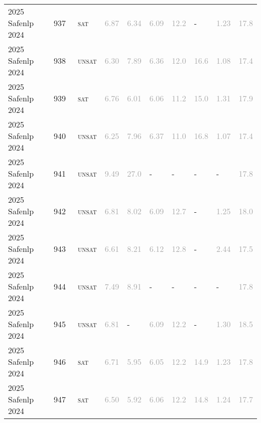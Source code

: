 \begin{center}
{\begin{longtable}{@{}llllllllll@{}}
2025 Safenlp 2024 & 937 & ~\textsc{sat} & \textcolor{darkgray}{6.87} & \textcolor{darkgray}{6.34} & \textcolor{darkgray}{6.09} & \textcolor{darkgray}{12.2} & - & \textcolor{darkgray}{1.23} & \textcolor{darkgray}{17.8} \\
2025 Safenlp 2024 & 938 & ~\textsc{unsat} & \textcolor{darkgray}{6.30} & \textcolor{darkgray}{7.89} & \textcolor{darkgray}{6.36} & \textcolor{darkgray}{12.0} & \textcolor{darkgray}{16.6} & \textcolor{darkgray}{1.08} & \textcolor{darkgray}{17.4} \\
2025 Safenlp 2024 & 939 & ~\textsc{sat} & \textcolor{darkgray}{6.76} & \textcolor{darkgray}{6.01} & \textcolor{darkgray}{6.06} & \textcolor{darkgray}{11.2} & \textcolor{darkgray}{15.0} & \textcolor{darkgray}{1.31} & \textcolor{darkgray}{17.9} \\
2025 Safenlp 2024 & 940 & ~\textsc{unsat} & \textcolor{darkgray}{6.25} & \textcolor{darkgray}{7.96} & \textcolor{darkgray}{6.37} & \textcolor{darkgray}{11.0} & \textcolor{darkgray}{16.8} & \textcolor{darkgray}{1.07} & \textcolor{darkgray}{17.4} \\
2025 Safenlp 2024 & 941 & ~\textsc{unsat} & \textcolor{darkgray}{9.49} & \textcolor{darkgray}{27.0} & - & - & - & - & \textcolor{darkgray}{17.8} \\
2025 Safenlp 2024 & 942 & ~\textsc{unsat} & \textcolor{darkgray}{6.81} & \textcolor{darkgray}{8.02} & \textcolor{darkgray}{6.09} & \textcolor{darkgray}{12.7} & - & \textcolor{darkgray}{1.25} & \textcolor{darkgray}{18.0} \\
2025 Safenlp 2024 & 943 & ~\textsc{unsat} & \textcolor{darkgray}{6.61} & \textcolor{darkgray}{8.21} & \textcolor{darkgray}{6.12} & \textcolor{darkgray}{12.8} & - & \textcolor{darkgray}{2.44} & \textcolor{darkgray}{17.5} \\
2025 Safenlp 2024 & 944 & ~\textsc{unsat} & \textcolor{darkgray}{7.49} & \textcolor{darkgray}{8.91} & - & - & - & - & \textcolor{darkgray}{17.8} \\
2025 Safenlp 2024 & 945 & ~\textsc{unsat} & \textcolor{darkgray}{6.81} & - & \textcolor{darkgray}{6.09} & \textcolor{darkgray}{12.2} & - & \textcolor{darkgray}{1.30} & \textcolor{darkgray}{18.5} \\
2025 Safenlp 2024 & 946 & ~\textsc{sat} & \textcolor{darkgray}{6.71} & \textcolor{darkgray}{5.95} & \textcolor{darkgray}{6.05} & \textcolor{darkgray}{12.2} & \textcolor{darkgray}{14.9} & \textcolor{darkgray}{1.23} & \textcolor{darkgray}{17.8} \\
2025 Safenlp 2024 & 947 & ~\textsc{sat} & \textcolor{darkgray}{6.50} & \textcolor{darkgray}{5.92} & \textcolor{darkgray}{6.06} & \textcolor{darkgray}{12.2} & \textcolor{darkgray}{14.8} & \textcolor{darkgray}{1.24} & \textcolor{darkgray}{17.7} \\

\end{longtable}}
\end{center}
